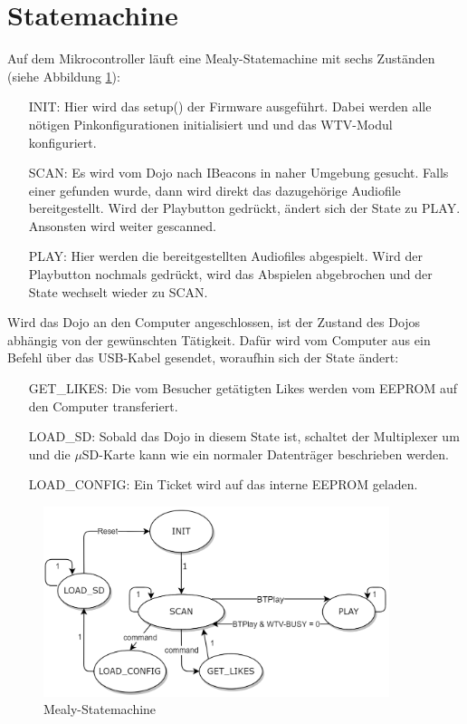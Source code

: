 \section{Statemachine}
Auf dem Mikrocontroller läuft eine Mealy-Statemachine mit sechs Zuständen (siehe Abbildung \ref{fig:mealy_statemachine}):\\
\begin{itemize}[leftmargin=3.2cm]
\item[INIT:] Hier wird das setup() der Firmware ausgeführt. Dabei werden alle nötigen Pinkonfigurationen initialisiert und und das WTV-Modul konfiguriert.
\item[SCAN:] Es wird vom Dojo nach IBeacons in naher Umgebung gesucht. Falls einer gefunden wurde, dann wird direkt das dazugehörige Audiofile bereitgestellt. Wird der Playbutton gedrückt, ändert sich der State zu PLAY. Ansonsten wird weiter gescanned.
\item[PLAY:] Hier werden die bereitgestellten Audiofiles abgespielt. Wird der Playbutton nochmals gedrückt, wird das Abspielen abgebrochen und der State wechselt wieder zu SCAN.
\end{itemize}
Wird das Dojo an den Computer angeschlossen, ist der Zustand des Dojos abhängig von der gewünschten Tätigkeit. Dafür wird vom Computer aus ein Befehl über das USB-Kabel gesendet, woraufhin sich der State ändert:
\begin{itemize}[leftmargin=3.2cm]
\item[GET\_LIKES:] Die vom Besucher getätigten Likes werden vom EEPROM auf den Computer transferiert.
\item[LOAD\_SD:] Sobald das Dojo in diesem State ist, schaltet der Multiplexer um und die $\mu$SD-Karte kann wie ein normaler Datenträger beschrieben werden.
\item[LOAD\_CONFIG:] Ein Ticket wird auf das interne EEPROM geladen.
\end{itemize}
\begin{figure}[h]
\centering
\includegraphics[width=0.9\textwidth]{Bilder/statemachine.PNG} 
\caption{Mealy-Statemachine}
\label{fig:mealy_statemachine}
\end{figure}
\newpage
